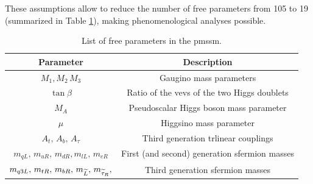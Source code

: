 These assumptions allow to reduce the number of free parameters from 105 to 19 (summarized in Table \ref{tab:pMMSpar}), making phenomenological analyses possible.


\begin{table}[h]
\centering
\begin{tabular}{c c}
\hline 
Parameter & Description \\ 
\hline 
\hline
$M_1, M_2  \, M_3 $ & Gaugino mass parameters \\ 
\hline 
$\tan \beta$ & Ratio of the \glspl{vev} of the two Higgs doublets \\ 
\hline 
$M_A$ & Pseudoscalar Higgs boson mass parameter \\ 
\hline 
$\mu$ & Higgsino mass parameter \\ 
\hline 
$  A_t, \, A_b, \, A_\tau    $ & Third generation trlinear couplings \\ 
\hline 
$m_{qL},  \,  m_{uR},  \, m_{dR},  m_{lL},  \, m_{eR}$ & First (and second) generation sfermion masses \\ 
\hline 
 $m_{q3L}, \, m_{tR}, \, m_{bR}, \, m_{\widetilde{L}}, \, m_{\widetilde{\tau}_R},$ & Third generation sfermion masses \\ 
\hline 
\end{tabular} 
\caption[Free parameters of the \gls{pmssm}]{\label{tab:pMMSpar}List of free parameters in the \gls{pmssm}.}
\end{table}





